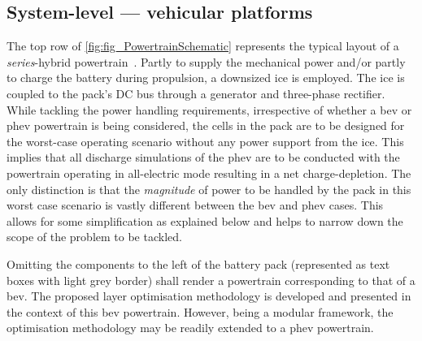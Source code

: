 \subsection{System-level --- vehicular platforms}

The top row of  \cref{fig:fig_PowertrainSchematic} represents the typical layout
of a \emph{series}-hybrid powertrain~\cite{Maksimovic2012}. Partly to supply the
mechanical  power and/or  partly  to  charge the  battery  during propulsion,  a
downsized \gls{ice} is  employed. The \gls{ice} is coupled to  the pack's DC bus
through  a  generator  and  three-phase  rectifier.  While  tackling  the  power
handling  requirements,  irrespective  of  whether  a  \gls{bev}  or  \gls{phev}
powertrain is  being considered, the  cells in the pack  are to be  designed for
the  worst-case operating  scenario \ie{}  without  any power  support from  the
\gls{ice}. This implies that all discharge  simulations of the \gls{phev} are to
be conducted with  the powertrain operating in all-electric mode  resulting in a
net charge-depletion. The only distinction is that the \emph{magnitude} of power
to  be handled  by the  pack in  this worst  case scenario  is vastly  different
between the \gls{bev} and \gls{phev}  cases. This allows for some simplification
as explained  below and  helps to  narrow down the  scope of  the problem  to be
tackled.

Omitting the  components to the  left of the  battery pack (represented  as text
boxes with light grey border) shall render a powertrain corresponding to that of
a  \gls{bev}.  The proposed  layer  optimisation  methodology is  developed  and
presented in the context of this  \gls{bev} powertrain. However, being a modular
framework, the optimisation methodology may  be readily extended to a \gls{phev}
powertrain.

